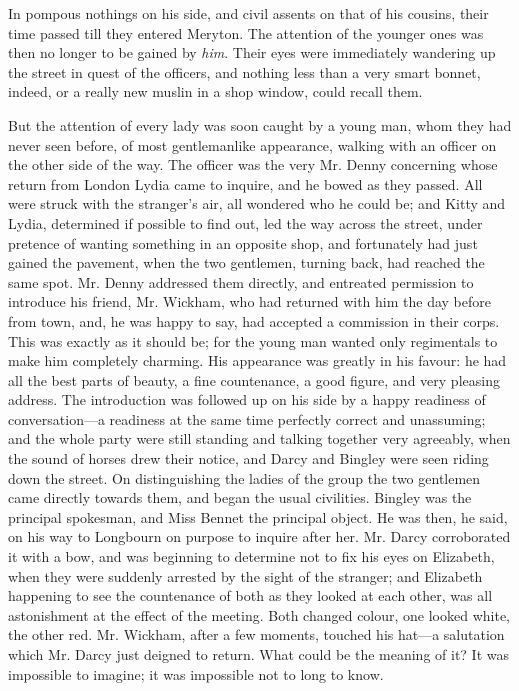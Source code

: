 \documentclass[12pt]{book}
\begin{document}
In pompous nothings on his side, and civil assents on that of his cousins, their time passed till they entered Meryton. The attention of the younger ones was then no longer to be gained by \textit{him}. Their eyes were immediately wandering up the street in quest of the officers, and nothing less than a very smart bonnet, indeed, or a really new muslin in a shop window, could recall them.

But the attention of every lady was soon caught by a young man, whom they had never seen before, of most gentlemanlike appearance, walking with an officer on the other side of the way. The officer was the very Mr. Denny concerning whose return from London Lydia came to inquire, and he bowed as they passed. All were struck with the stranger's air, all wondered who he could be; and Kitty and Lydia, determined if possible to find out, led the way across the street, under pretence of wanting something in an opposite shop, and fortunately had just gained the pavement, when the two gentlemen, turning back, had reached the same spot. Mr. Denny addressed them directly, and entreated permission to introduce his friend, Mr. Wickham, who had returned with him the day before from town, and, he was happy to say, had accepted a commission in their corps. This was exactly as it should be; for the young man wanted only regimentals to make him completely charming. His appearance was greatly in his favour: he had all the best parts of beauty, a fine countenance, a good figure, and very pleasing address. The introduction was followed up on his side by a happy readiness of conversation---a readiness at the same time perfectly correct and unassuming; and the whole party were still standing and talking together very agreeably, when the sound of horses drew their notice, and Darcy and Bingley were seen riding down the street. On distinguishing the ladies of the group the two gentlemen came directly towards them, and began the usual civilities. Bingley was the principal spokesman, and Miss Bennet the principal object. He was then, he said, on his way to Longbourn on purpose to inquire after her. Mr. Darcy corroborated it with a bow, and was beginning to determine not to fix his eyes on Elizabeth, when they were suddenly arrested by the sight of the stranger; and Elizabeth happening to see the countenance of both as they looked at each other, was all astonishment at the effect of the meeting. Both changed colour, one looked white, the other red. Mr. Wickham, after a few moments, touched his hat---a salutation which Mr. Darcy just deigned to return. What could be the meaning of it? It was impossible to imagine; it was impossible not to long to know.
\end{document}
